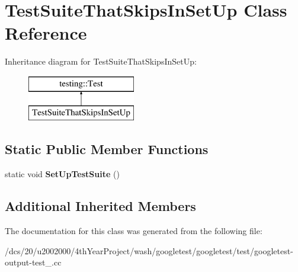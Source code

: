 \hypertarget{classTestSuiteThatSkipsInSetUp}{}\section{Test\+Suite\+That\+Skips\+In\+Set\+Up Class Reference}
\label{classTestSuiteThatSkipsInSetUp}
Inheritance diagram for Test\+Suite\+That\+Skips\+In\+Set\+Up\+:\begin{figure}[H]
\begin{center}
\leavevmode
\includegraphics[height=2.000000cm]{classTestSuiteThatSkipsInSetUp}
\end{center}
\end{figure}
\subsection*{Static Public Member Functions}
\begin{DoxyCompactItemize}
\item 
\mbox{\label{classTestSuiteThatSkipsInSetUp_a4a3d908d8b5500e48dbd381cf5c0ba3d}} 
static void {\bfseries Set\+Up\+Test\+Suite} ()
\end{DoxyCompactItemize}
\subsection*{Additional Inherited Members}


The documentation for this class was generated from the following file\+:\begin{DoxyCompactItemize}
\item 
/dcs/20/u2002000/4th\+Year\+Project/wash/googletest/googletest/test/googletest-\/output-\/test\+\_\+.\+cc\end{DoxyCompactItemize}
